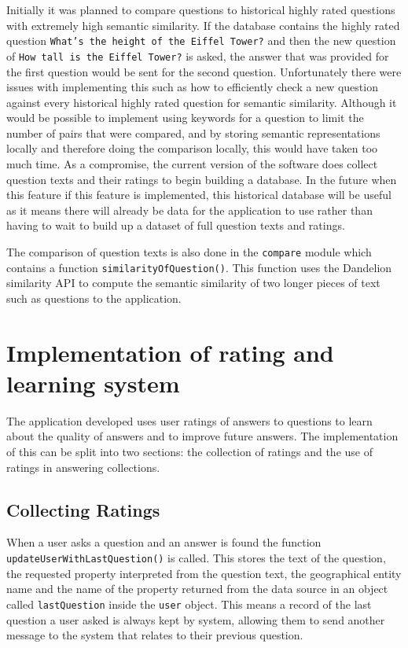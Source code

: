 \documentclass[authoryearcitations]{UoYCSproject}
\begin{document}
Initially it was planned to compare questions to historical highly rated questions with extremely high semantic similarity. If the database contains the highly rated question \texttt{What's the height of the Eiffel Tower?} and then the new question of \texttt{How tall is the Eiffel Tower?} is asked, the answer that was provided for the first question would be sent for the second question. Unfortunately there were issues with implementing this such as how to efficiently check a new question against every historical highly rated question for semantic similarity. Although it would be possible to implement using keywords for a question to limit the number of pairs that were compared, and by storing semantic representations locally and therefore doing the comparison locally, this would have taken too much time. As a compromise, the current version of the software does collect question texts and their ratings to begin building a database. In the future when this feature if this feature is implemented, this historical database will be useful as it means there will already be data for the application to use rather than having to wait to build up a dataset of full question texts and ratings.

The comparison of question texts is also done in the \texttt{compare} module which contains a function \texttt{similarityOfQuestion()}. This function uses the Dandelion~\cite{serviceDandelionSim} similarity API to compute the semantic similarity of two longer pieces of text such as questions to the application.

\section{Implementation of rating and learning system}
\label{sec:implementationRatingLearningSys}

The application developed uses user ratings of answers to questions to learn about the quality of answers and to improve future answers. The implementation of this can be split into two sections: the collection of ratings and the use of ratings in answering collections.

\sloppy
\subsection{Collecting Ratings}
\label{subsec:collectingRatings}

When a user asks a question and an answer is found the function \texttt{updateUserWithLastQuestion()} is called. This stores the text of the question, the requested property interpreted from the question text, the geographical entity name and the name of the property returned from the data source in an object called \texttt{lastQuestion} inside the \texttt{user} object. This means a record of the last question a user asked is always kept by system, allowing them to send another message to the system that relates to their previous question. 
\end{document}
